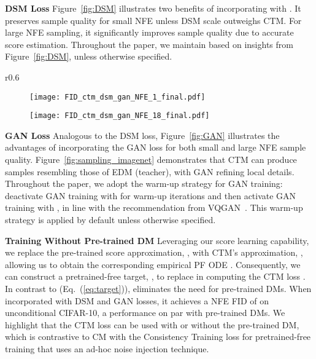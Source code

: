 \documentclass{article} \usepackage{iclr2024_coNFErence,times}
\def\eqref#1{equation~\ref{#1}}
\def\eqref#1{(\ref{#1})}
\def\eqref#1{(\ref{#1})}
\theoremstyle{definition}
\theoremstyle{remark}
\begin{document}
 
\textbf{DSM Loss } Figure~\ref{fig:DSM} illustrates two benefits of incorporating  with . It preserves sample quality for small NFE unless DSM scale outweighs CTM. For large NFE sampling, it significantly improves sample quality due to accurate score estimation. Throughout the paper, we maintain  based on insights from Figure~\ref{fig:DSM}, unless otherwise specified.


\begin{wrapfigure}{r}{0.6\textwidth}
\vskip -0.2in
\centering
\begin{subfigure}{0.48\linewidth}
\centering
		\texttt{[image: FID\_ctm\_dsm\_gan\_NFE\_1\_final.pdf]}
	\end{subfigure}	
	\begin{subfigure}{0.48\linewidth}
		\centering
		\texttt{[image: FID\_ctm\_dsm\_gan\_NFE\_18\_final.pdf]}
	\end{subfigure}	
\vskip -0.05in
 \caption{The effect of GAN loss.}
	\label{fig:GAN}
  \vskip -0.2in
 \end{wrapfigure}
\textbf{GAN Loss } Analogous to the DSM loss, Figure~\ref{fig:GAN} illustrates the advantages of incorporating the GAN loss for both small and large NFE sample quality. Figure~\ref{fig:sampling_imagenet} demonstrates that CTM can produce samples resembling those of EDM (teacher), with GAN refining local details. Throughout the paper, we adopt the warm-up strategy for GAN training: deactivate GAN training with  for warm-up iterations and then activate GAN training with , in line with the recommendation from VQGAN~\citep{esser2021taming}. This warm-up strategy is applied by default unless otherwise specified.



\textbf{Training Without Pre-trained DM } Leveraging our score learning capability, we replace the pre-trained score approximation, , with CTM's approximation, , allowing us to obtain the corresponding empirical PF ODE . Consequently, we can construct a pretrained-free target, , to replace  in computing the CTM loss . In contrast to  (Eq.~\eqref{eq:target}),  eliminates the need for pre-trained DMs. When incorporated with DSM and GAN losses, it achieves a NFE  FID of  on unconditional CIFAR-10, a performance on par with pre-trained DMs. We highlight that the CTM loss can be used with or without the pre-trained DM, which is contrastive to CM with the Consistency Training loss for pretrained-free training that uses an ad-hoc noise injection technique.
\end{document}

